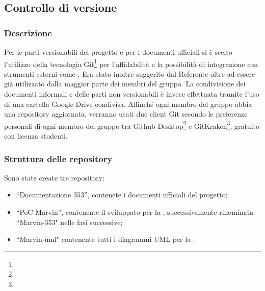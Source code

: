 \documentclass[NormeDiProgetto.tex]{subfiles}
\begin{document}
	\subsection{Controllo di versione}
	
	\subsubsection{Descrizione}
	Per le parti versionabili del progetto e per i documenti ufficiali si è scelto l'utilizzo della tecnologia Git\footnote{} per l'affidabilità e la possibilità di integrazione con strumenti esterni come . Era stato inoltre suggerito dal Referente oltre ad essere già utilizzato dalla maggior parte dei membri del gruppo.
	La condivisione dei documenti informali e delle parti non versionabili è invece effettuata tramite l'uso di una cartella Google Drive condivisa.
	Affinché ogni membro del gruppo abbia una repository aggiornata, verranno usati due client Git secondo le preferenze personali di ogni membro del gruppo tra Github Desktop\footnote{} e GitKraken\footnote{}, gratuito con licenza studenti.
	
	\subsubsection{Struttura delle repository}
	Sono state create tre repository:
	\begin{itemize}
		\item \textquotedblleft Documentazione 353\textquotedblright, contenete i documenti ufficiali del progetto;
		\item \textquotedblleft PoC Marvin\textquotedblright, contenente il \poc sviluppato per la \tb, successivamente rinominata \textquotedblleft Marvin-353" nelle fasi successive;
		\item \textquotedblleft Marvin-uml" contenente tutti i diagrammi UML per la \pb.
	\end{itemize}
	
\end{document}
